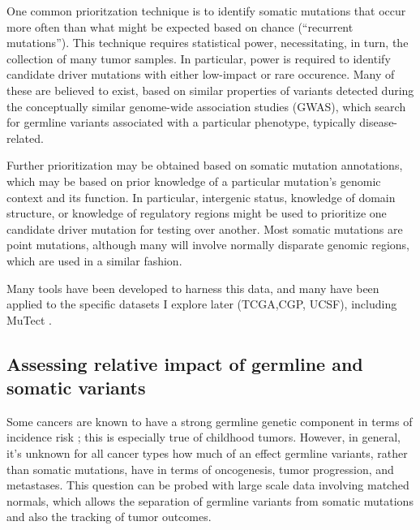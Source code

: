         One common prioritzation technique is to identify somatic
        mutations that occur more often than what might be expected
        based on chance (``recurrent mutations''). This technique
        requires statistical power, necessitating, in turn, the
        collection of many tumor
        samples\cite{leiserson_pan-cancer_2015}. In particular, power
        is required to identify candidate driver mutations with either
        low-impact or rare occurence. Many of these are believed to
        exist, based on similar properties of variants detected during
        the conceptually similar genome-wide association studies
        (GWAS), which search for germline variants associated with a
        particular phenotype, typically disease-related. 
        
        Further prioritization may be obtained based on somatic
        mutation annotations, which may be based on prior knowledge of
        a particular mutation's genomic context and its function. In particular,
        intergenic status, knowledge of domain structure, or knowledge
        of regulatory regions might be used to prioritize one
        candidate driver mutation for testing over another. Most
        somatic mutations are point mutations\cite{lawrence_mutational_2013}, although 
        many will involve normally disparate genomic regions, which
        are used in a similar fashion.

        Many tools have been developed to harness this data, and many
        have been applied to the specific datasets I explore later
        (TCGA,CGP, UCSF), including MuTect
        \cite{cibulskis_sensitive_2013}.


        \subsection{Assessing relative impact of germline and somatic variants}

        Some cancers are known to have a strong germline genetic component in
        terms of incidence risk \cite{stacey_germline_2011}; this is especially true of
        childhood tumors. However, in general, it's unknown for all
        cancer types how much of an effect germline variants, rather
        than somatic mutations, have in terms of oncogenesis,
        tumor progression, and metastases. This question can be probed
        with large scale data        
        involving matched normals, which allows the separation of
        germline variants from somatic mutations and also the tracking
        of tumor outcomes.

